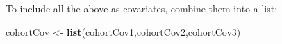 \documentclass[
]{article}
\newenvironment{Shaded}{\begin{snugshade}}{\end{snugshade}}
\newcommand{\KeywordTok}[1]{\textcolor[rgb]{0.13,0.29,0.53}{\textbf{#1}}}
\newcommand{\NormalTok}[1]{#1}
\newcommand{\StringTok}[1]{\textcolor[rgb]{0.31,0.60,0.02}{#1}}
\begin{document}
To include all the above as covariates, combine them into a list:

\begin{Shaded}
\begin{Highlighting}[]
\NormalTok{cohortCov <-}\StringTok{ }\KeywordTok{list}\NormalTok{(cohortCov1,cohortCov2,cohortCov3)}
\end{Highlighting}
\end{Shaded}
\end{document}
